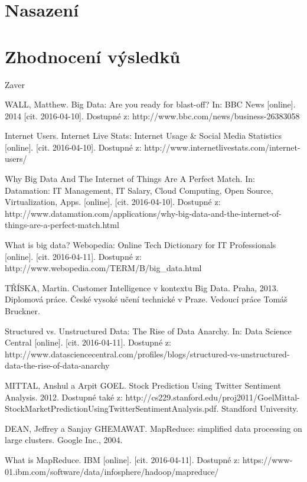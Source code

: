 \documentclass[thesis=B,czech]{FITthesis}[2012/06/26]
\begin{document}
\chapter{Nasazení}

\chapter{Zhodnocení výsledků}



\begin{conclusion}
	Zaver
\end{conclusion}



\begin{thebibliography}{1}

 WALL, Matthew. Big Data: Are you ready for blast-off? In: BBC News [online]. 2014 [cit. 2016-04-10]. Dostupné z: http://www.bbc.com/news/business-26383058

 Internet Users. Internet Live Stats: Internet Usage \& Social Media Statistics [online]. [cit. 2016-04-10]. Dostupné z: http://www.internetlivestats.com/internet-users/

 Why Big Data And The Internet of Things Are A Perfect Match. In: Datamation: IT Management, IT Salary, Cloud Computing, Open Source, Virtualization, Apps. [online]. [cit. 2016-04-10]. Dostupné z: http://www.datamation.com/applications/why-big-data-and-the-internet-of-things-are-a-perfect-match.html

 What is big data? Webopedia: Online Tech Dictionary for IT Professionals [online]. [cit. 2016-04-11]. Dostupné z: http://www.webopedia.com/TERM/B/big\_data.html

 TŘÍSKA, Martin. Customer Intelligence v kontextu Big Data. Praha, 2013. Diplomová práce. České vysoké učení technické v Praze. Vedoucí práce Tomáš Bruckner.

Structured vs. Unstructured Data: The Rise of Data Anarchy. In: Data Science Central [online]. [cit. 2016-04-11]. Dostupné z: http://www.datasciencecentral.com/profiles/blogs/structured-vs-unstructured-data-the-rise-of-data-anarchy

MITTAL, Anshul a Arpit GOEL. Stock Prediction Using Twitter Sentiment Analysis. 2012. Dostupné také z: http://cs229.stanford.edu/proj2011/GoelMittal-StockMarketPredictionUsingTwitterSentimentAnalysis.pdf. Standford University.

DEAN, Jeffrey a Sanjay GHEMAWAT. MapReduce: simplified data processing on large clusters. Google Inc., 2004.

What is MapReduce. IBM [online]. [cit. 2016-04-11]. Dostupné z: https://www-01.ibm.com/software/data/infosphere/hadoop/mapreduce/


  
\end{thebibliography}
\end{document}
